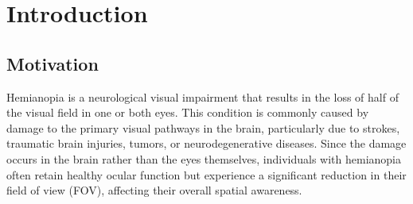 \documentclass{l4proj}
\begin{document}
\chapter{Introduction}




\section{Motivation}




Hemianopia is a neurological visual impairment that results in the loss of half of the visual field in one or both eyes. This condition is commonly caused by damage to the primary visual pathways in the brain, particularly due to strokes, traumatic brain injuries, tumors, or neurodegenerative diseases. Since the damage occurs in the brain rather than the eyes themselves, individuals with hemianopia often retain healthy ocular function but experience a significant reduction in their field of view (FOV), affecting their overall spatial awareness.  
\end{document}
